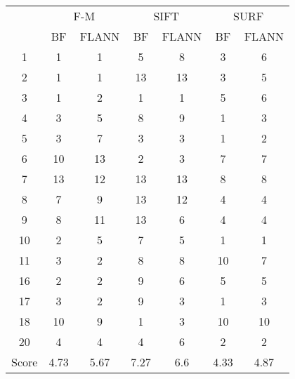 \documentclass[draft,final]{vutinfth} %
\begin{document}
\begin{appendices}
\begin{minipage}{\linewidth}
\centering
\begin{tabular}{c|cc|cc|cc}
\multirow{2}{*}{ } & \multicolumn{2}{c}{ F-M } & \multicolumn{2}{c}{ SIFT } & \multicolumn{2}{c}{ SURF } \\
& BF & FLANN & BF & FLANN & BF & FLANN \\
\hline
1 & 1 & 1 & 5 & 8 & 3 & 6 \\
2 & 1 & 1 & 13 & 13 & 3 & 5 \\
3 & 1 & 2 & 1 & 1 & 5 & 6 \\
4 & 3 & 5 & 8 & 9 & 1 & 3 \\
5 & 3 & 7 & 3 & 3 & 1 & 2 \\
6 & 10 & 13 & 2 & 3 & 7 & 7 \\
7 & 13 & 12 & 13 & 13 & 8 & 8 \\
8 & 7 & 9 & 13 & 12 & 4 & 4 \\
9 & 8 & 11 & 13 & 6 & 4 & 4 \\
10 & 2 & 5 & 7 & 5 & 1 & 1 \\
11 & 3 & 2 & 8 & 8 & 10 & 7 \\
16 & 2 & 2 & 9 & 6 & 5 & 5 \\
17 & 3 & 2 & 9 & 3 & 1 & 3 \\
18 & 10 & 9 & 1 & 3 & 10 & 10 \\
20 & 4 & 4 & 4 & 6 & 2 & 2 \\
\hline
Score & 4.73 & 5.67 & 7.27 & 6.6 & 4.33 & 4.87 \\
\end{tabular}

 \label{tab:20Mean} 
\end{minipage}


\end{appendices}
\end{document}
